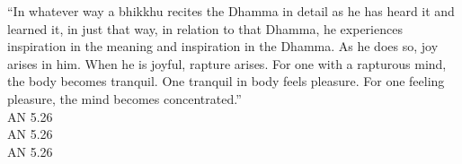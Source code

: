 {  %
  {\quote ``In whatever way a bhikkhu recites the Dhamma in detail as he has heard it and learned it, in just that way, in relation to that Dhamma, he experiences inspiration in the meaning and inspiration in the Dhamma. As he does so, joy arises in him. When he is joyful, rapture arises. For one with a rapturous mind, the body becomes tranquil. One tranquil in body feels pleasure. For one feeling pleasure, the mind becomes concentrated.''\\}
  \ifafive \smallskip AN 5.26\\[1.4\baselineskip]\fi
  \ifninebythirteen \smallskip \fontsize{8}{14}\selectfont AN 5.26\\[1.4\baselineskip]\fi
  \ifbfive \smallskip AN 5.26\\[1.4\baselineskip]\fi
}

